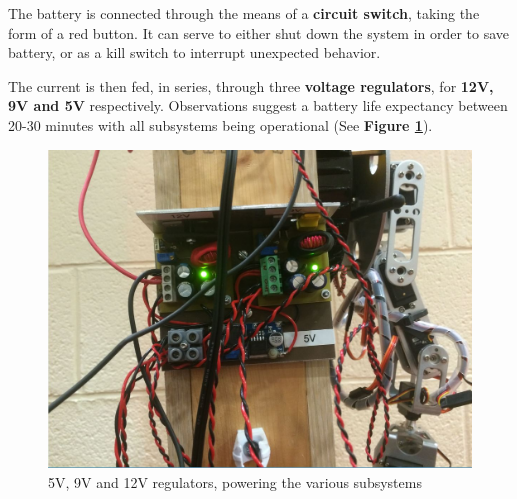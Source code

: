 \documentclass[12p,a4paper]{report}
\begin{document}
The battery is connected through the means of a \textbf{circuit switch}, taking the form of a red button. It can serve to either shut down the system in order to save battery, or as a kill switch to interrupt unexpected behavior.

The current is then fed, in series, through three \textbf{voltage regulators}, for \textbf{12V, 9V and 5V} respectively. Observations suggest a battery life expectancy between 20-30 minutes with all subsystems being operational (See \textbf{Figure \ref{fig:voltageregulators}}). 
\begin{figure}[H]
\begin{center}
\includegraphics[scale=0.50]{voltage_regulators_low}
\caption{5V, 9V and 12V regulators, powering the various subsystems}
\label{fig:voltageregulators}
\end{center}
\end{figure}
\end{document}
